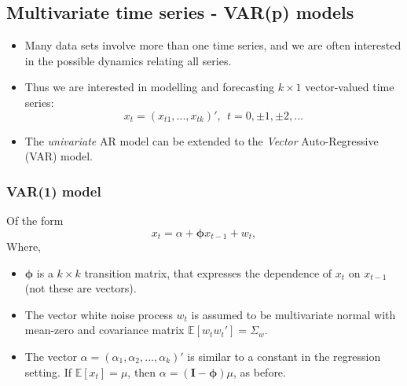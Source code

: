 \documentclass[11pt]{article}
\newcommand{\noi}{\noindent}
\begin{document}
\subsection{Multivariate time series - VAR(p) models}
\begin{itemize}
    \item Many data sets involve more than one time series, and we are often interested in the possible dynamics relating all series.
    \item Thus we are interested in modelling and forecasting $k \times 1$ vector-valued time series:
        $$x_t = (x_{t1}, ..., x_{tk})', \: \: t=0, \pm 1, \pm 2,...$$
    \item The \textit{univariate} AR model can be extended to the \textit{Vector} Auto-Regressive (VAR) model.
\end{itemize}

\subsubsection{VAR(1) model}
\noi Of the form
$$x_t = \alpha + \boldsymbol{\phi}x_{t-1} + w_t, $$
\noi Where,
\begin{itemize}
    \item $\boldsymbol{\phi}$ is a $k \times k$ transition matrix, that expresses the dependence of $x_t$ on $x_{t-1}$ (not these are vectors).
    \item The vector white noise process $w_t$ is assumed to be multivariate normal with mean-zero and covariance matrix $\mathbb{E}[w_tw_t'] = \Sigma_w$.
    \item The vector $\alpha = (\alpha_1, \alpha_2, ..., \alpha_k)'$ is similar to a constant in the regression setting. If $\mathbb{E}[x_t] = \mu$, then $\alpha = (\boldsymbol{I} - \boldsymbol{\phi})\mu$, as before.
\end{itemize} \phantom{i}
\end{document}
